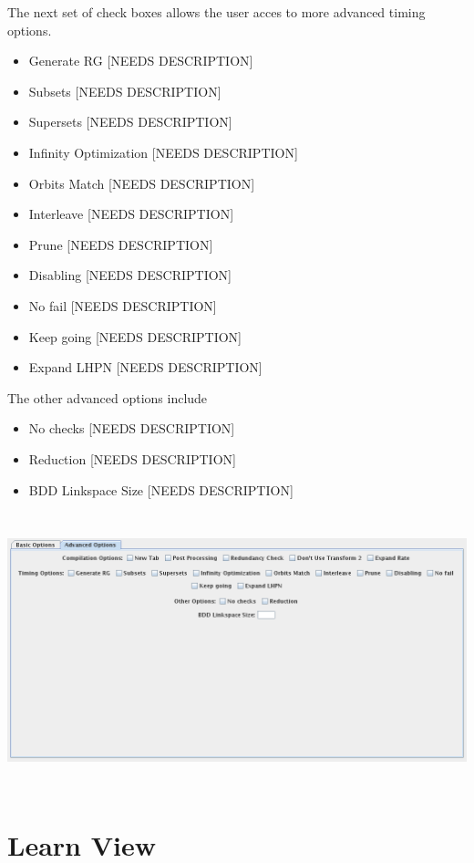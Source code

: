 \documentclass[titlepage,11pt]{article}
\begin{document}
The next set of check boxes allows the user acces to more advanced timing
options.
\begin{itemize}
\item Generate RG [NEEDS DESCRIPTION]
\item Subsets [NEEDS DESCRIPTION]
\item Supersets [NEEDS DESCRIPTION]
\item Infinity Optimization [NEEDS DESCRIPTION]
\item Orbits Match [NEEDS DESCRIPTION]
\item Interleave [NEEDS DESCRIPTION]
\item Prune [NEEDS DESCRIPTION]
\item Disabling [NEEDS DESCRIPTION]
\item No fail [NEEDS DESCRIPTION]
\item Keep going [NEEDS DESCRIPTION]
\item Expand LHPN [NEEDS DESCRIPTION]
\end{itemize}

The other advanced options include
\begin{itemize}
\item No checks [NEEDS DESCRIPTION]
\item Reduction [NEEDS DESCRIPTION]
\item BDD Linkspace Size [NEEDS DESCRIPTION]
\end{itemize}
\begin{center}
\includegraphics[height=80mm]{screenshots/advOptions}
\end{center}

\section{\label{Learn}Learn View}
\end{document}
